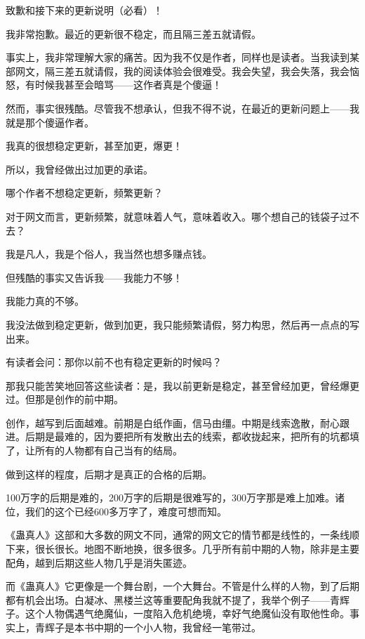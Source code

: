 \begin{this_body} %

致歉和接下来的更新说明（必看）！

我非常抱歉。最近的更新很不稳定，而且隔三差五就请假。

事实上，我非常理解大家的痛苦。因为我不仅是作者，同样也是读者。当我读到某部网文，隔三差五就请假，我的阅读体验会很难受。我会失望，我会失落，我会恼怒，有时候我甚至会暗骂——这作者真是个傻逼！

然而，事实很残酷。尽管我不想承认，但我不得不说，在最近的更新问题上——我就是那个傻逼作者。

我真的很想稳定更新，甚至加更，爆更！

所以，我曾经做出过加更的承诺。

哪个作者不想稳定更新，频繁更新？

对于网文而言，更新频繁，就意味着人气，意味着收入。哪个想自己的钱袋子过不去？

我是凡人，我是个俗人，我当然也想多赚点钱。

但残酷的事实又告诉我——我能力不够！

我能力真的不够。

我没法做到稳定更新，做到加更，我只能频繁请假，努力构思，然后再一点点的写出来。

有读者会问：那你以前不也有稳定更新的时候吗？

那我只能苦笑地回答这些读者：是，我以前更新是稳定，甚至曾经加更，曾经爆更过。但那是创作的前中期。

创作，越写到后面越难。前期是白纸作画，信马由缰。中期是线索逸散，耐心跟进。后期是最难的，因为要把所有发散出去的线索，都收拢起来，把所有的坑都填了，让所有的人物都有自己当有的结局。

做到这样的程度，后期才是真正的合格的后期。

100万字的后期是难的，200万字的后期是很难写的，300万字那是难上加难。诸位，我们的这个已经600多万字了，难度可想而知。

《蛊真人》这部和大多数的网文不同，通常的网文它的情节都是线性的，一条线顺下来，很长很长。地图不断地换，很多很多。几乎所有前中期的人物，除非是主要配角，越到后期这些人物几乎是消失匿迹。

而《蛊真人》它更像是一个舞台剧，一个大舞台。不管是什么样的人物，到了后期都有机会出场。白凝冰、黑楼兰这等重要配角我就不提了，我举个例子——青辉子。这个人物偶遇气绝魔仙，一度陷入危机绝境，幸好气绝魔仙没有取他性命。事实上，青辉子是本书中期的一个小人物，我曾经一笔带过。


\end{this_body}
